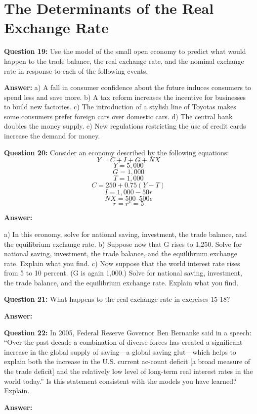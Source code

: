 \documentclass[a4paper, 11pt]{article}
\begin{document}
\section{The Determinants of the Real Exchange Rate}

\textbf{Question 19:} Use the model of the small open economy to predict what would happen to the trade balance, the real exchange rate, and the nominal exchange rate in response to each of the following events.

\textbf{Answer:} 
a) A fall in consumer confidence about the future induces consumers to spend less and save more.
b) A tax reform increases the incentive for businesses to build new factories.
c) The introduction of a stylish line of Toyotas makes some consumers prefer foreign cars over domestic cars.
d) The central bank doubles the money supply.
e) New regulations restricting the use of credit cards increase the demand for money.

\textbf{Question 20:} Consider an economy described by the following equations:
$$Y = C + I + G + NX$$
$$Y = 5,000$$
$$G = 1,000$$
$$T = 1,000$$
$$C = 250 + 0.75(Y − T)$$
$$I = 1,000 − 50r$$
$$NX = 500 – 500\epsilon$$
$$r = r^{∗} = 5$$

\textbf{Answer:} 

a) In this economy, solve for national saving, investment, the trade balance, and the equilibrium exchange rate.
b) Suppose now that G rises to 1,250. Solve for national saving, investment, the trade balance, and the equilibrium exchange rate. Explain what you find.
c) Now suppose that the world interest rate rises from 5 to 10 percent. (G is again 1,000.) Solve for national saving, investment, the trade balance, and the equilibrium exchange rate. Explain what you find.

\textbf{Question 21:} What happens to the real exchange rate in exercises 15-18?

\textbf{Answer:} 


\textbf{Question 22:} In 2005, Federal Reserve Governor Ben Bernanke said in a speech: “Over the past decade a combination of diverse forces has created a significant increase in the global supply of saving—a global saving glut—which helps to explain both the increase in the U.S. current ac-count deficit [a broad measure of the trade deficit] and the relatively low level of long-term real interest rates in the world today.” Is this statement consistent with the models you have learned? Explain.

\textbf{Answer:} 
\end{document}
